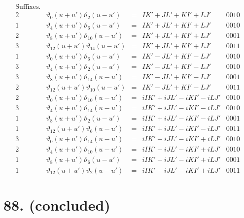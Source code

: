 \documentclass[11pt,a4paper]{article}
\newcommand{\uth}[1]{\vartheta_{#1}}
\begin{document}
\[
\begin{array}{ccccc}
\text{Suffixes.} & & & & \\
\hline
2 & \uth{0}(u+u')\uth{2}(u-u') &=& IK' + JL' + KI' + LJ' & 0010 \\
1 & \uth{4}(u+u')\uth{6}(u-u') &=& IK' + JL' + KI' + LJ' & 0010 \\
2 & \uth{8}(u+u')\uth{10}(u-u') &=& IK' + JL' + KI' + LJ' & 0001 \\
3 & \uth{12}(u+u')\uth{14}(u-u') &=& IK' + JL' + KI' + LJ' & 0011 \\
\hline
1 & \uth{0}(u+u')\uth{6}(u-u') &=& IK' - JL' + KI' - LJ' & 0010 \\
3 & \uth{4}(u+u')\uth{2}(u-u') &=& IK' - JL' + KI' - LJ' & 0010 \\
3 & \uth{8}(u+u')\uth{14}(u-u') &=& IK' - JL' + KI' - LJ' & 0001 \\
2 & \uth{12}(u+u')\uth{10}(u-u') &=& IK' - JL' + KI' - LJ' & 0011 \\
\hline
2 & \uth{0}(u+u')\uth{10}(u-u') &=& iIK' + iJL' - iKI' - iLJ' & 0010 \\
3 & \uth{4}(u+u')\uth{14}(u-u') &=& iIK' + iJL' - iKI' - iLJ' & 0010 \\
1 & \uth{8}(u+u')\uth{2}(u-u') &=& iIK' + iJL' - iKI' - iLJ' & 0001 \\
1 & \uth{12}(u+u')\uth{6}(u-u') &=& iIK' + iJL' - iKI' - iLJ' & 0011 \\
\hline
3 & \uth{0}(u+u')\uth{14}(u-u') &=& iIK' - iJL' - iKI' + iLJ' & 0010 \\
2 & \uth{4}(u+u')\uth{10}(u-u') &=& iIK' - iJL' - iKI' + iLJ' & 0010 \\
1 & \uth{8}(u+u')\uth{6}(u-u') &=& iIK' - iJL' - iKI' + iLJ' & 0001 \\
1 & \uth{12}(u+u')\uth{2}(u-u') &=& iIK' - iJL' - iKI' + iLJ' & 0011
\end{array}
\]

\newpage
\section*{88. (concluded)}
\label{sec:88conc}
\end{document}
